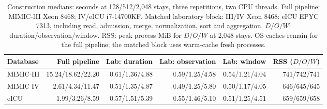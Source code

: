 \begin{table}[!t]
\centering\small
\setlength{\tabcolsep}{2pt}
\caption{Construction medians: seconds at 128/512/2,048 stays, three repetitions, two CPU threads. Full pipeline: MIMIC-III Xeon 8468; IV/eICU i7-14700KF. Matched laboratory block: III/IV Xeon 8468; eICU EPYC 7313, including read, admission, merge, normalization, sort and aggregation. $D/O/W$: duration/observation/window. RSS: peak process MiB for $D/O/W$ at 2,048 stays. OS caches remain for the full pipeline; the matched block uses warm-cache fresh processes.}
\label{tab:pipeline}
\begin{tabular}{lrrrrr}
\toprule
Database & Full pipeline & Lab: duration & Lab: observation & Lab: window & RSS ($D/O/W$) \\
\midrule
MIMIC-III & 15.24/18.62/22.20 & 0.61/1.36/4.88 & 0.59/1.25/4.58 & 0.54/1.21/4.04 & 741/742/741 \\
MIMIC-IV & 2.61/4.34/11.47 & 0.51/1.35/4.87 & 0.49/1.25/5.80 & 0.50/1.17/4.05 & 646/645/645 \\
eICU & 1.99/3.26/8.59 & 0.57/1.51/5.39 & 0.55/1.46/5.10 & 0.51/1.25/4.51 & 659/659/658 \\
\bottomrule
\end{tabular}
\end{table}
